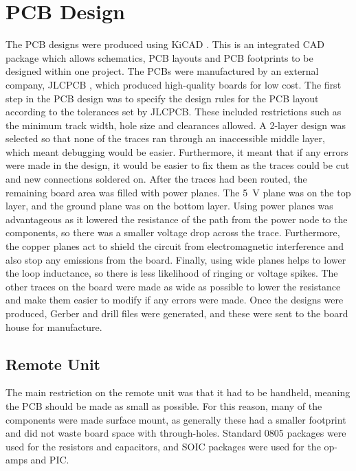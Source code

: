 \section{PCB Design}
The PCB designs were produced using KiCAD \cite{kicad}. This is an integrated CAD package which allows schematics, PCB layouts and PCB footprints to be designed within one project. The PCBs were manufactured by an external company, JLCPCB \cite{pcb_house}, which produced high-quality boards for low cost. The first step in the PCB design was to specify the design rules for the PCB layout according to the tolerances set by JLCPCB. These included restrictions such as the minimum track width, hole size and clearances allowed. A 2-layer design was selected so that none of the traces ran through an inaccessible middle layer, which meant debugging would be easier. Furthermore, it meant that if any errors were made in the design, it would be easier to fix them as the traces could be cut and new connections soldered on. After the traces had been routed, the remaining board area was filled with power planes. The \SI{+5}{\volt} plane was on the top layer, and the ground plane was on the bottom layer. Using power planes was advantageous as it lowered the resistance of the path from the power node to the components, so there was a smaller voltage drop across the trace. Furthermore, the copper planes act to shield the circuit from electromagnetic interference and also stop any emissions from the board. Finally, using wide planes helps to lower the loop inductance, so there is less likelihood of ringing or voltage spikes. The other traces on the board were made as wide as possible to lower the resistance and make them easier to modify if any errors were made. Once the designs were produced, Gerber and drill files were generated, and these were sent to the board house for manufacture.\\


\subsection{Remote Unit}
The main restriction on the remote unit was that it had to be handheld, meaning the PCB should be made as small as possible. For this reason, many of the components were made surface mount, as generally these had a smaller footprint and did not waste board space with through-holes. Standard 0805 packages were used for the resistors and capacitors, and SOIC packages were used for the op-amps and PIC.\\

